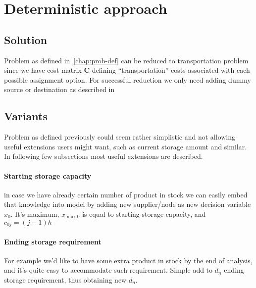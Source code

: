
\chapter{Deterministic approach}
\label{chap:Deterministic approach}

\section{Solution}
\label{sec:Solution}

Problem as defined in~\ref{chap:prob-def} can be reduced to transportation problem \autocite{or-textbook} since we have cost matrix $\mathbf{C}$ defining ``transportation'' costs associated with each possible assignment option. For successful reduction we only need adding dummy source or destination as described in \autocite{or-textbook}

\section{Variants}
\label{sec:Variants}

Problem as defined previously could seem rather simplistic and not allowing useful extensions users might want, such as current storage amount and similar. In following few subsections most useful extensions are described.

\subsubsection{Starting storage capacity}
in case we have already certain number of product in stock we can easily embed that knowledge into model by adding new supplier/node as new decision variable $x_0$. It's maximum, $x_{\max0}$ is equal to starting storage capacity, and $c_{0j} = \left( j - 1 \right) h$

\subsubsection{Ending storage requirement}
\label{subs:Ending storage requirement}
For example we'd like to have some extra product in stock by the end of analysis, and it's quite easy to accommodate such requirement. Simple add to $d_n$ ending storage requirement, thus obtaining new $d_n$.

